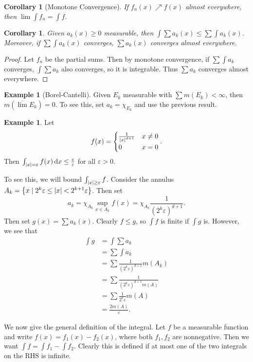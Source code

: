 \documentclass[leqno, openany]{memoir}
\newtheorem{cor}[thm]{Corollary}
\theoremstyle{definition}
\newtheorem{exm}[thm]{Example}
\theoremstyle{remark}
\theoremstyle{plain}
\theoremstyle{definition}
\theoremstyle{remark}
\newcommand{\ep}{\varepsilon}
\newcommand{\ol}[1]{\overline{#1}}
\begin{document}
\begin{cor}[Monotone Convergence] If $f_n(x) \nearrow f(x)$ almost everywhere,
then $\lim \int f_n = \int f$.  \end{cor}

\begin{cor} Given $a_k(x) \geq 0$ measurable, then $\int \sum a_k(x) \leq \sum
\int a_k(x)$. Moreover, if $\sum \int a_k(x)$ converges, $\sum a_k(x)$
converges almost everywhere.  \end{cor}

\begin{proof} Let $f_n$ be the partial sums. Then by monotone convergence, if
$\sum \int a_k$ converges, $\int \sum a_k$ also converges, so it is integrable.
Thus $\sum a_k$ converges almost everywhere.  \end{proof}

\begin{exm}[Borel-Cantelli] Given $E_k$ measurable with $\sum m(E_k) < \infty$,
then $m(\ol{\lim} E_k) = 0$. To see this, set $a_k = \chi_{E_k}$ and use the
previous result.  \end{exm}

\begin{exm} Let \[ f(x) = \begin{cases} \frac{1}{\abs{x}^{d+1}} & x \neq 0 \\ 0
& x = 0 \end{cases}. \] Then $\int_{\abs{x}=\ep} f(x) \dd{x} \leq
\frac{c}{\ep}$ for all $\ep > 0$.

    To see this, we will bound $\int_{\abs{x} \geq \ep} f$. Consider the
    annulus $A_k = \qty{x \mid 2^k \ep \leq \abs{x} < 2^{k+1} \ep}$. Then set
    \[ a_k = \chi_{A_k} \sup_{x \in A_k} f(x) = \chi_{A_k} \frac{1}{( 2^k \ep
    )^{d+1}}. \] Then set $g(x) = \sum a_k(x)$. Clearly $f \leq g$, so $\int f$
    is finite if $\int g$ is. However, we see that \begin{align*} \int g &=
        \int \sum a_k \\ &= \sum \int a_k \\ &= \sum \frac{1}{(2^k \ep)^{d+1}}
        m(A_k) \\ &= \sum \frac{1}{(2^k \ep)^{d+1} m(A)} \\ &= \sum
        \frac{1}{2^k \ep} m(A) \\ &= \frac{2m(A)}{\ep}.  \end{align*} \end{exm}

We now give the general definition of the integral. Let $f$ be a measurable
function and write $f(x) = f_1(x) - f_2(x)$, where both $f_1, f_2$ are
nonnegative. Then we want $\int f = \int f_1 - \int f_2$. Clearly this is
defined if at most one of the two integrals on the RHS is infinite.
\end{document}
